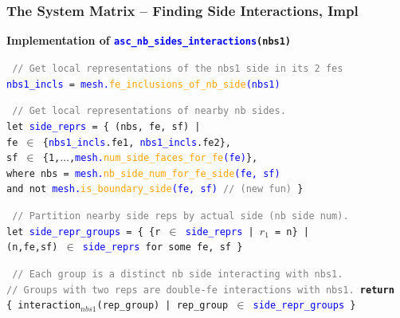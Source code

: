 \documentclass[compress]{beamer}
\begin{document}
\begin{frame}
  \frametitle{The System Matrix -- Finding Side Interactions, Impl}
  \textbf{Implementation of \texttt{\large \textcolor{blue}{asc\_nb\_sides\_interactions}(nbs1)}}

  \pause
  \vspace{0.2cm}
  \texttt{\small
    \textcolor{gray}{// Get local representations of the nbs1 side in its 2 fes}\\
    \textcolor{blue}{nbs1\_incls} = \textcolor{blue}{mesh.\textcolor{orange}{fe\_inclusions\_of\_nb\_side}(nbs1)}
  }
  
  \pause
  \vspace{0.2cm}
  \texttt{\small
  \textcolor{gray}{// Get local representations of nearby nb sides.}\\
  let \textcolor{blue}{side\_reprs} = \{ (nbs, fe, sf) |\\
    \hspace{0.2cm}  fe $\in$ \{\textcolor{blue}{nbs1\_incls}.fe1, \textcolor{blue}{nbs1\_incls}.fe2\},\\
    \hspace{0.2cm}  sf $\in$ \{1,$\dots$,\textcolor{blue}{mesh.\textcolor{orange}{num\_side\_faces\_for\_fe}(fe)}\},\\
    \hspace{0.5cm}  where nbs = \textcolor{blue}{mesh.\textcolor{orange}{nb\_side\_num\_for\_fe\_side}(fe, sf)}\\
    \hspace{0.5cm}  and not \textcolor{blue}{mesh.\textcolor{orange}{is\_boundary\_side}(fe, sf)} \textcolor{gray}{// (new fun)} \}
  }

  \pause
  \vspace{0.2cm}
  \texttt{\small
    \textcolor{gray}{// Partition nearby side reps by actual side (nb side num).}\\
    let \textcolor{blue}{side\_repr\_groups} = \{ \{r $\in$ \textcolor{blue}{side\_reprs} | $r_1$ = n\} |\\
      \hspace{0.5cm} (n,fe,sf) $\in$ \textcolor{blue}{side\_reprs} for some fe, sf \}
  }

  \pause
  \vspace{0.2cm}
  \texttt{\small
    \textcolor{gray}{// Each group is a distinct nb side interacting with nbs1.}\\
    \textcolor{gray}{// Groups with two reps are double-fe interactions with nbs1.}
    \textbf{return}\\
    \hspace{0.2cm} \{ interaction$_{nbs1}$(rep\_group) | rep\_group $\in$ \textcolor{blue}{side\_repr\_groups} \}
  }
\end{frame}
\end{document}
